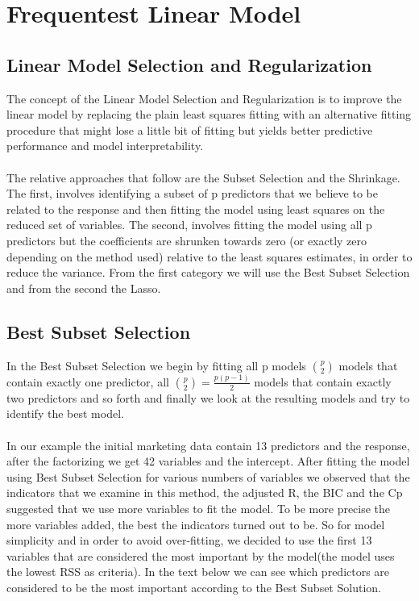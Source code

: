 \documentclass{article}
\begin{document}
\section{Frequentest Linear Model }
\subsection{Linear Model Selection and Regularization}  
The concept of the Linear Model Selection and Regularization is to improve the linear model by replacing the plain least squares fitting with an alternative fitting procedure that might lose a little bit of fitting but yields better predictive performance and model interpretability. 
\\\\
The relative approaches that follow are the Subset Selection and the Shrinkage. The first, involves identifying a subset of p predictors that we believe to be related to the response and then fitting the model using least squares on the reduced set of variables. The second, involves fitting the model using all p predictors but the coefficients are shrunken towards zero (or exactly zero depending on the method used) relative to the least squares estimates, in order to reduce the variance. From the first category we will use the Best Subset Selection and from the second the Lasso.

\subsection{Best Subset Selection}

In the Best Subset Selection we begin by fitting all p models $\binom{p}{2}$ models that contain exactly one predictor, all $\binom{p}{2} =\frac{p(p-1)}2$ models that contain exactly two predictors and so forth and finally we look at the resulting models and try to identify the best model.
\\\\
In our example the initial marketing data contain 13 predictors and the response, after the factorizing we get 42 variables and the intercept. After fitting the model using Best Subset Selection for various numbers of variables we observed that the indicators that we examine in this method, the adjusted R, the BIC and the Cp suggested that we use more variables to fit the model. To be more precise the more variables added, the best the indicators turned out to be. So for model simplicity and in order to avoid over-fitting, we decided to use the first 13 variables that are considered the most important by the model(the model uses the lowest RSS as criteria). In the text below we can see which predictors are considered to be the most important according to the Best Subset Solution.
\end{document}
